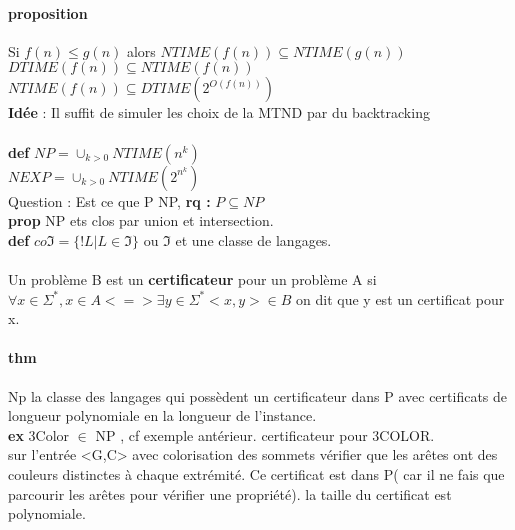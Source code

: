 \documentclass{article}
\begin{document}
\paragraph{proposition} Si $f(n) \leq g(n)$ alors $NTIME(f(n)) \subseteq NTIME(g(n))$\\$DTIME(f(n)) \subseteq NTIME(f(n))$\\$NTIME(f(n)) \subseteq DTIME(2^{O(f(n))})$\\ \textbf{Idée} : Il suffit de simuler les choix de la MTND par du backtracking\\\\\textbf{def} $NP = \cup _{k>0} NTIME(n^k)$\\$NEXP = \cup _{k>0} NTIME(2^{n^k})$\\Question : Est ce que P NP, \textbf{rq :} $P\subseteq NP$\\\textbf{prop} NP ets clos par union et intersection.\\\textbf{def} $co\Im = \{!L | L \in \Im\}$ ou $\Im$ et une classe de langages.

\paragraph{} Un problème B est un \textbf{certificateur} pour un problème A si $\forall x \in \Sigma^{*}, x \in A <=> \exists y\in \Sigma^{*} <x,y> \in B$ on dit que y est un certificat pour x.

\paragraph{thm} Np la classe des langages qui possèdent un certificateur dans P avec certificats de longueur polynomiale en la longueur de l'instance. \\\textbf{ex } 3Color $\in$ NP , cf exemple antérieur. certificateur pour 3COLOR.\\{sur l'entrée <G,C> avec colorisation des sommets vérifier que les arêtes ont des couleurs distinctes à chaque extrémité}. Ce certificat est dans P( car il ne fais que parcourir les arêtes pour vérifier une propriété). la taille du certificat est polynomiale. 
\end{document}

